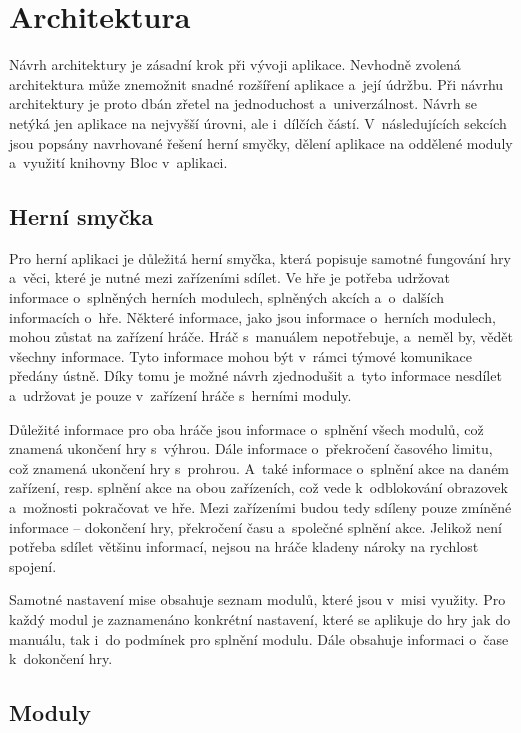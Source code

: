 \section{Architektura}

Návrh architektury je zásadní krok při vývoji aplikace.
Nevhodně zvolená architektura může znemožnit snadné rozšíření aplikace
a~její údržbu.
Při návrhu architektury je proto dbán zřetel na jednoduchost a~univerzálnost.
Návrh se netýká jen aplikace na nejvyšší úrovni,
ale i~dílčích částí. 
V~následujících sekcích jsou popsány navrhované řešení herní smyčky,
dělení aplikace na oddělené moduly a~využití knihovny Bloc v~aplikaci.

\subsection{Herní smyčka}

Pro herní aplikaci je důležitá herní smyčka,
která popisuje samotné fungování hry a~věci,
které je nutné mezi zařízeními sdílet.
Ve hře je potřeba udržovat informace o~splněných herních modulech,
splněných akcích a~o~dalších informacích o~hře.
Některé informace, jako jsou informace o~herních modulech,
mohou zůstat na zařízení hráče.
Hráč s~manuálem nepotřebuje,
a~neměl by,
vědět všechny informace.
Tyto informace mohou být v~rámci týmové komunikace předány ústně.
Díky tomu je možné návrh zjednodušit a~tyto informace nesdílet
a~udržovat je pouze v~zařízení hráče s~herními moduly.

Důležité informace pro oba hráče jsou informace o~splnění všech modulů,
což znamená ukončení hry s~výhrou.
Dále informace o~překročení časového limitu,
což znamená ukončení hry s~prohrou.
A~také informace o~splnění akce na daném zařízení,
resp. splnění akce na obou zařízeních,
což vede k~odblokování obrazovek a~možnosti pokračovat ve hře.
Mezi zařízeními budou tedy sdíleny pouze zmíněné informace --
dokončení hry, překročení času a~společné splnění akce.
Jelikož není potřeba sdílet většinu informací,
nejsou na hráče kladeny nároky na rychlost spojení.

Samotné nastavení mise obsahuje seznam modulů,
které jsou v~misi využity.
Pro každý modul je zaznamenáno konkrétní nastavení,
které se aplikuje do hry jak do manuálu, tak i~do podmínek pro splnění modulu.
Dále obsahuje informaci o~čase k~dokončení hry.

\subsection{Moduly}

